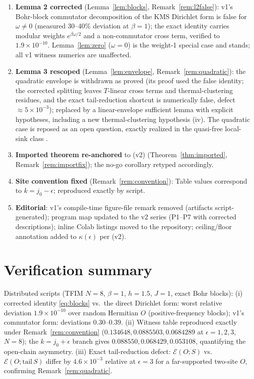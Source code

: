 \documentclass[11pt,a4paper]{article}
\theoremstyle{plain}
\theoremstyle{definition}
\theoremstyle{remark}
\newcommand{\eps}{\epsilon}
\begin{document}
\begin{enumerate}
\item \textbf{Lemma 2 corrected} (Lemma~\ref{lem:blocks},
Remark~\ref{rem:l2false}): v1's Bohr-block commutator decomposition of the
KMS Dirichlet form is false for $\omega \ne 0$ (measured $30$--$40\%$
deviation at $\beta = 1$); the exact identity carries modular weights
$e^{\beta\omega/2}$ and a non-commutator cross term, verified to
$1.9\times 10^{-10}$. Lemma~\ref{lem:zero} ($\omega = 0$) is the weight-1
special case and stands; all v1 witness numerics are unaffected.
\item \textbf{Lemma 3 rescoped} (Lemma~\ref{lem:envelope},
Remark~\ref{rem:quadratic}): the quadratic envelope is withdrawn as proved
(its proof used the false identity; the corrected splitting leaves $T$-linear
cross terms and thermal-clustering residues, and the exact tail-reduction
shortcut is numerically false, defect $\approx 5\times 10^{-3}$); replaced by
a linear-envelope sufficient lemma with explicit hypotheses, including a new
thermal-clustering hypothesis (iv). The quadratic case is reposed as an open
question, exactly realized in the quasi-free local-sink class \cite{HCut}.
\item \textbf{Imported theorem re-anchored} to \cite{MaintWork} (v2)
(Theorem~\ref{thm:imported}, Remark~\ref{rem:importfix}); the no-go corollary
retyped accordingly.
\item \textbf{Site convention fixed} (Remark~\ref{rem:convention}): Table
values correspond to $k = j_0 - \eps$; reproduced exactly by script.
\item \textbf{Editorial}: v1's compile-time figure-file remark removed
(artifacts script-generated); program map updated to the v2 series
(P1--P7 with corrected descriptions); inline Colab listings moved to the
repository; ceiling/floor annotation added to $\kappa(\eps)$ per
\cite{Stress} (v2).
\end{enumerate}

\section{Verification summary}\label{app:verification}

Distributed scripts (TFIM $N = 8$, $\beta = 1$, $h = 1.5$, $J = 1$, exact
Bohr blocks): (i) corrected identity \eqref{eq:blocks} vs.\ the direct
Dirichlet form: worst relative deviation $1.9\times 10^{-10}$ over random
Hermitian $O$ (positive-frequency blocks); v1's commutator form: deviations
$0.30$--$0.39$. (ii) Witness table reproduced exactly under
Remark~\ref{rem:convention} ($0.134648, 0.0885503, 0.0684289$ at $\eps = 1,
2, 3$, $N = 8$); the $k = j_0 + \eps$ branch gives $0.088550, 0.068429,
0.053108$, quantifying the open-chain asymmetry. (iii) Exact tail-reduction
defect: $\mathcal{E}(O; S)$ vs.\ $\mathcal{E}(O; \mathrm{tail}\,S)$ differ
by $4.6\times 10^{-3}$ relative at $\eps = 3$ for a far-supported two-site
$O$, confirming Remark~\ref{rem:quadratic}.
\end{document}
